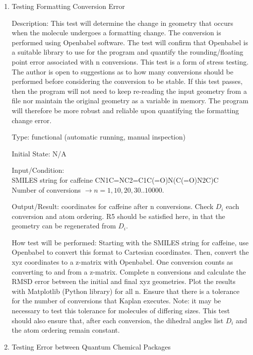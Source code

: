 \documentclass[12pt, titlepage]{article}
\newcommand{\progname}{Kaplan} %
\begin{document}
\begin{enumerate}
	
\item Testing Formatting Conversion Error

Description: This test will determine the change in geometry that occurs when 
the molecule undergoes a formatting change. The conversion is performed using 
Openbabel software. The test will confirm that Openbabel is a suitable library 
to use for the program and quantify the rounding/floating point error 
associated with n conversions. This test is a form of 
stress testing. The author is open to suggestions as to how many conversions 
should be performed before considering the conversion to be stable. If this 
test passes, then the program will not need to keep re-reading the input 
geometry from a file nor maintain the original geometry as a variable in 
memory. The program will therefore be more robust and reliable upon quantifying 
the formatting change error.

Type: functional (automatic running, manual inspection)

Initial State: N/A

Input/Condition: \\
SMILES string for caffeine CN1C=NC2=C1C(=O)N(C(=O)N2C)C \\
Number of conversions $\rightarrow n = {1, 10, 20, 30..10000}$.

Output/Result: coordinates for caffeine after n conversions. Check $D_i$ each 
conversion and atom ordering. R5 should be satisfied here, in that the geometry 
can be regenerated from $D_i$.

How test will be performed: Starting with the SMILES string for caffeine, use 
Openbabel to convert this format to Cartesian coordinates. Then, convert the 
xyz coordinates to a z-matrix with Openbabel. One conversion counts as 
converting to and from a z-matrix. Complete n conversions and calculate the 
RMSD error between the initial and final xyz geometries. Plot the results 
with Matplotlib (Python library) for all n. Ensure that there is a tolerance 
for the number of conversions that \progname{} executes. Note: it may be 
necessary to test this tolerance for molecules of differing sizes. This test 
should also ensure that, after each conversion, the dihedral angles list $D_i$ 
and the atom ordering remain constant.

\item Testing Error between Quantum Chemical Packages


\end{enumerate}
\end{document}
